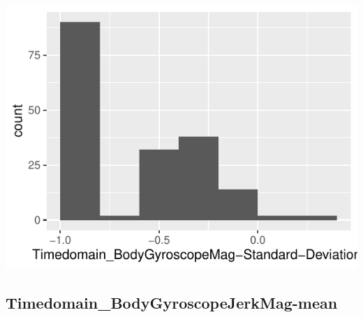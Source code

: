 \documentclass[
]{article}
\begin{document}
\begin{minipage}{0.25 \textwidth}

\includegraphics{codebook_tidydatasub_files/figure-latex/Var-40-Timedomain-BodyGyroscopeMag-Standard-Deviation--1.pdf}

\end{minipage}

\noindent\makebox[\linewidth]{\rule{\textwidth}{0.4pt}}

\hypertarget{timedomain_bodygyroscopejerkmag-mean}{%
\subsection{Timedomain\_BodyGyroscopeJerkMag-mean}\label{timedomain_bodygyroscopejerkmag-mean}}
\end{document}
